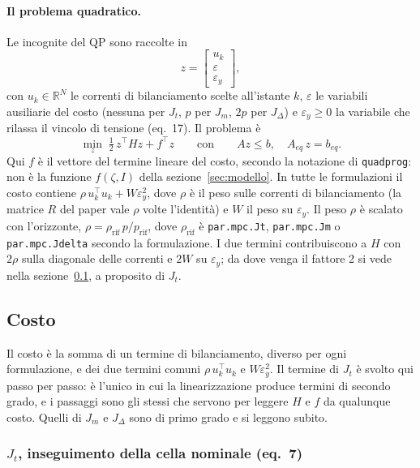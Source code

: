 \documentclass[11pt,a4paper]{article}
\begin{document}
\paragraph{Il problema quadratico.} Le incognite del QP sono raccolte in
\[
  z = \begin{bmatrix} u_k \\ \varepsilon \\ \varepsilon_y \end{bmatrix},
\]
con $u_k \in \mathbb{R}^N$ le correnti di bilanciamento scelte all'istante $k$, $\varepsilon$ le
variabili ausiliarie del costo (nessuna per $J_t$, $p$ per $J_m$, $2p$ per
$J_\Delta$) e $\varepsilon_y \ge 0$ la variabile che rilassa il vincolo di
tensione (eq.~17). Il problema è
\[
  \min_z \; \tfrac12\, z^\top H z + f^\top z
  \qquad \text{con} \qquad A z \le b, \quad A_{eq}\, z = b_{eq} .
\]
Qui $f$ è il vettore del termine lineare del costo, secondo la notazione di
\texttt{quadprog}: non è la funzione $f(\zeta, I)$ della
sezione~\ref{sec:modello}. In tutte le formulazioni il costo contiene
$\rho\, u_k^\top u_k + W \varepsilon_y^2$, dove $\rho$ è il peso sulle correnti di
bilanciamento (la matrice $R$ del paper vale $\rho$ volte l'identità) e $W$
il peso su $\varepsilon_y$. Il peso $\rho$ è scalato con l'orizzonte,
$\rho = \rho_{\mathrm{rif}}\, p / p_{\mathrm{rif}}$, dove $\rho_{\mathrm{rif}}$
è \texttt{par.mpc.Jt}, \texttt{par.mpc.Jm} o \texttt{par.mpc.Jdelta} secondo
la formulazione. I due termini contribuiscono a $H$ con $2\rho$ sulla
diagonale delle correnti e $2W$ su $\varepsilon_y$; da dove venga il fattore 2
si vede nella sezione~\ref{sec:costo}, a proposito di $J_t$.

\subsection{Costo}\label{sec:costo}

Il costo è la somma di un termine di bilanciamento, diverso per ogni
formulazione, e dei due termini comuni $\rho\, u_k^\top u_k$ e $W \varepsilon_y^2$. Il termine
di $J_t$ è svolto qui passo per passo: è l'unico in cui la linearizzazione
produce termini di secondo grado, e i passaggi sono gli stessi che servono
per leggere $H$ e $f$ da qualunque costo. Quelli di $J_m$ e $J_\Delta$ sono
di primo grado e si leggono subito.

\subsubsection{$J_t$, inseguimento della cella nominale (eq.~7)}
\end{document}
